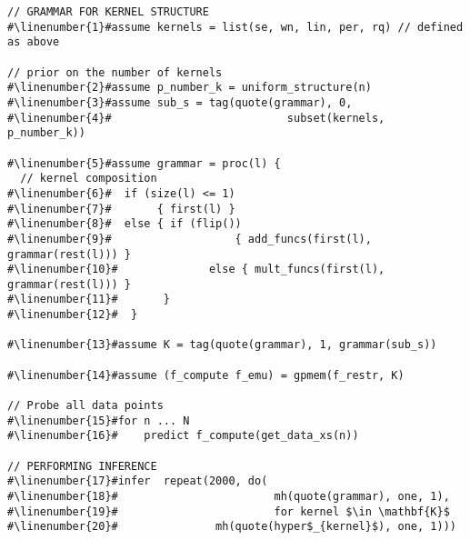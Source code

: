 \begin{mdframed}
\begin{minipage}{\linewidth}
\small
\belowcaptionskip=-10pt
\begin{lstlisting}[mathescape,label=alg:structureVent,basicstyle=\selectfont\ttfamily,numbers=none,escapechar=\#]
// GRAMMAR FOR KERNEL STRUCTURE
#\linenumber{1}#assume kernels = list(se, wn, lin, per, rq) // defined as above

// prior on the number of kernels
#\linenumber{2}#assume p_number_k = uniform_structure(n)
#\linenumber{3}#assume sub_s = tag(quote(grammar), 0,
#\linenumber{4}#                           subset(kernels, p_number_k))

#\linenumber{5}#assume grammar = proc(l) {
  // kernel composition
#\linenumber{6}#  if (size(l) <= 1)
#\linenumber{7}#       { first(l) }
#\linenumber{8}#  else { if (flip()) 
#\linenumber{9}#                   { add_funcs(first(l), grammar(rest(l))) }
#\linenumber{10}#              else { mult_funcs(first(l), grammar(rest(l))) }
#\linenumber{11}#       }
#\linenumber{12}#  }
                          
#\linenumber{13}#assume K = tag(quote(grammar), 1, grammar(sub_s))

#\linenumber{14}#assume (f_compute f_emu) = gpmem(f_restr, K)

// Probe all data points
#\linenumber{15}#for n ... N
#\linenumber{16}#    predict f_compute(get_data_xs(n))

// PERFORMING INFERENCE  
#\linenumber{17}#infer  repeat(2000, do(
#\linenumber{18}#                        mh(quote(grammar), one, 1),
#\linenumber{19}#                        for kernel $\in \mathbf{K}$ 
#\linenumber{20}# 			    mh(quote(hyper$_{kernel}$), one, 1)))
\end{lstlisting}

\end{minipage}
\end{mdframed}
